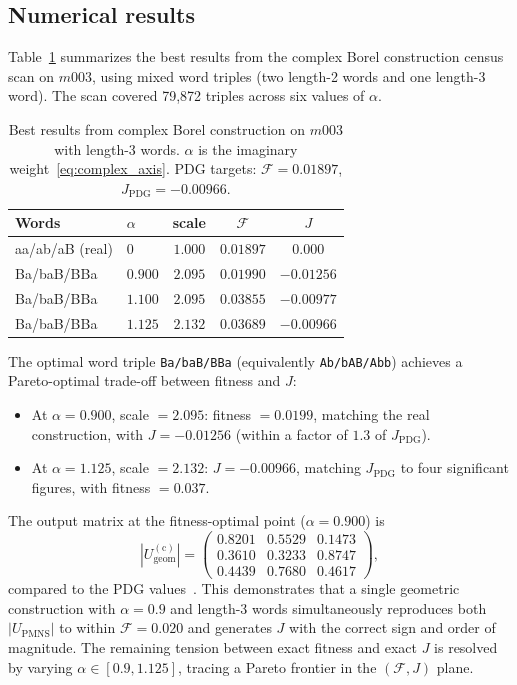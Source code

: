 \documentclass[floatfix,aps,prd,twocolumn,showpacs,superscriptaddress,longbibliography]{revtex4-2}
\begin{document}
\subsection{Numerical results}

Table~\ref{tab:complex_results} summarizes the best results
from the complex Borel construction census scan on $m003$,
using mixed word triples (two length-2 words and one length-3 word).
The scan covered 79,872 triples across six values of $\alpha$.

\begin{table}[h]
\centering
\caption{Best results from complex Borel construction on $m003$
with length-3 words. $\alpha$ is the imaginary weight~\eqref{eq:complex_axis}.
PDG targets: $\mathcal{F} = 0.01897$, $J_{\mathrm{PDG}} = -0.00966$.}
\label{tab:complex_results}
\begin{tabular}{llccc}
\toprule
Words & $\alpha$ & scale & $\mathcal{F}$ & $J$ \\
\midrule
aa/ab/aB (real)   & $0$     & $1.000$ & $0.01897$ & $0.000$ \\
Ba/baB/BBa        & $0.900$ & $2.095$ & $0.01990$ & $-0.01256$ \\
Ba/baB/BBa        & $1.100$ & $2.095$ & $0.03855$ & $-0.00977$ \\
Ba/baB/BBa        & $1.125$ & $2.132$ & $0.03689$ & $-0.00966$ \\
\bottomrule
\end{tabular}
\end{table}

The optimal word triple \texttt{Ba/baB/BBa} (equivalently
\texttt{Ab/bAB/Abb}) achieves a Pareto-optimal trade-off
between fitness and $J$:
\begin{itemize}
\item At $\alpha = 0.900$, scale $= 2.095$: fitness $= 0.0199$,
matching the real construction, with $J = -0.01256$
(within a factor of $1.3$ of $J_{\mathrm{PDG}}$).
\item At $\alpha = 1.125$, scale $= 2.132$: $J = -0.00966$,
matching $J_{\mathrm{PDG}}$ to four significant figures,
with fitness $= 0.037$.
\end{itemize}
The output matrix at the fitness-optimal point ($\alpha = 0.900$) is
\begin{equation}
|U_{\mathrm{geom}}^{(\mathrm{c})}| = \begin{pmatrix}
0.8201 & 0.5529 & 0.1473 \\
0.3610 & 0.3233 & 0.8747 \\
0.4439 & 0.7680 & 0.4617
\end{pmatrix},
\end{equation}
compared to the PDG values~\cite{Gentry:PMNS}.
This demonstrates that a single geometric construction with
$\alpha = 0.9$ and length-3 words simultaneously reproduces
both $|U_{\mathrm{PMNS}}|$ to within $\mathcal{F} = 0.020$ and
generates $J$ with the correct sign and order of magnitude.
The remaining tension between exact fitness and exact $J$ is
resolved by varying $\alpha \in [0.9, 1.125]$, tracing a
Pareto frontier in the $(\mathcal{F}, J)$ plane.
\end{document}
